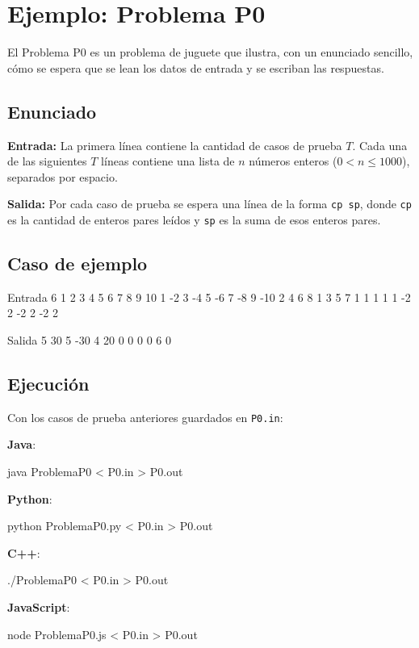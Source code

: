 \section{Ejemplo: Problema P0}
El Problema P0 es un problema de juguete que ilustra, con un enunciado sencillo, cómo se espera que se lean los datos de entrada y se escriban las respuestas.

\subsection{Enunciado}
\textbf{Entrada:} La primera línea contiene la cantidad de casos de prueba $T$. Cada una de las siguientes $T$ líneas contiene una lista de $n$ números enteros ($0 < n \leq 1000$), separados por espacio.

\textbf{Salida:} Por cada caso de prueba se espera una línea de la forma \texttt{cp sp}, donde \texttt{cp} es la cantidad de enteros pares leídos y \texttt{sp} es la suma de esos enteros pares.

\subsection{Caso de ejemplo}
\begin{pseudocode}
Entrada
6
1 2 3 4 5 6 7 8 9 10
1 -2 3 -4 5 -6 7 -8 9 -10
2 4 6 8
1 3 5 7
1 1 1 1 1
-2 2 -2 2 -2 2

Salida
5 30
5 -30
4 20
0 0
0 0
6 0
\end{pseudocode}

\subsection{Ejecución}
Con los casos de prueba anteriores guardados en \texttt{P0.in}:

\textbf{Java}:
\begin{pseudocode}
java ProblemaP0 < P0.in > P0.out
\end{pseudocode}

\textbf{Python}:
\begin{pseudocode}
python ProblemaP0.py < P0.in > P0.out
\end{pseudocode}

\textbf{C++}:
\begin{pseudocode}
./ProblemaP0 < P0.in > P0.out
\end{pseudocode}

\textbf{JavaScript}:
\begin{pseudocode}
node ProblemaP0.js < P0.in > P0.out
\end{pseudocode}
